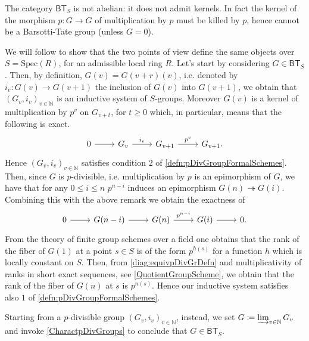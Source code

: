 \documentclass[../Main]{subfiles}
\begin{document}
\begin{rem}[]
	The category $\mathsf{BT}_S$ is not abelian:
	it does not admit kernels.
	In fact the kernel of the morphism $p\colon G \to G$
	of multiplication by $p$ must be killed by $p$, hence cannot be
	a Barsotti-Tate group (unless $G=0$).
\end{rem}


\begin{rem}
	We will follow \cite[\S2, remark 2.3 and \S3, theorem 2.1.7]{Messing} to show that
	the two points of view define the same objects over $S = \mathrm{Spec}(R)$,
	for an admissible local ring $R$.
	Let's start by considering $G \in \mathsf{BT}_S$.
	Then, by definition, $G(v) = G(v+r)(v)$, i.e. denoted by $i_v\colon G(v) \to G(v+1)$
	the inclusion of $G(v)$ into $G(v+1)$, we obtain that 
	$\left( G_v, i_v \right)_{v \in \mathbb{N}}$ is an inductive system of $S$-groups.
	Moreover $G(v)$ is a kernel of multiplication by $p^v$ on $G_{v+t}$, for $t \geq 0$
	which, in particular, means that the following is exact.
	\begin{equation*}
	\begin{tikzcd}
		0 \arrow[r, "", rightarrow] &
		G_v \arrow[r, "i_v", rightarrow] &
		G_{v+1} \arrow[r, "p^v", rightarrow] &
		G_{v+1}
	.\end{tikzcd}
	\end{equation*}
	Hence $\left( G_v, i_v \right)_{v \in \mathbb{N}}$ satisfies condition $2$
	of \cref{defn:pDivGroupFormalSchemes}.
	Then, since $G$ is $p$-divisible, i.e. multiplication by $p$ is an
	epimorphism of $G$, we have that for any $0 \leq i \leq n$
	$p^{n-i}$ induces an epimorphism $G(n) \twoheadrightarrow G(i)$.
	Combining this with the above remark we obtain the exactness of
	\begin{equation}\label{diag:equivpDivGrDefn}
	\begin{tikzcd}
		0 \arrow[r, "", rightarrow] &
		G(n-i) \arrow[r, "", rightarrow] &
		G(n) \arrow[r, "p^{n-i}", rightarrow] &
		G(i) \arrow[r, "", rightarrow] &
		0
	.\end{tikzcd}
	\end{equation}
	From the theory of finite group schemes over a field one obtains that the
	rank of the fiber of $G(1)$ at a point $s \in S$ is of the form
	$p^{h(s)}$ for a function $h$ which is locally constant on $S$.
	Then, from \cref{diag:equivpDivGrDefn} and multiplicativity of
	ranks in short exact sequences, see \cref{QuotientGroupScheme}, we obtain
	that the rank of the fiber of $G(n)$ at $s$
	is $p^{n(s)}$.
	Hence our inductive system satisfies also $1$ 
	of \cref{defn:pDivGroupFormalSchemes}.

	Starting from a $p$-divisible group $\left( G_v, i_v \right)_{v \in \mathbb{N}}$,
	instead, we set $G \coloneqq \varinjlim_{v \in \mathbb{N}} G_v$
	and invoke \cref{CharactpDivGroups} to conclude that $G \in \mathsf{BT}_S$.
\end{rem}
\end{document}
